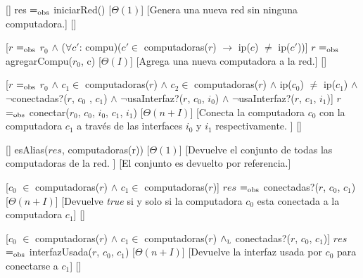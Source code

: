 \begin{Interfaz}
  


  

  [] %
  {res $=_{\mathrm{obs}}$ iniciarRed()} %
  [$\Theta(1)$] %
  [Genera una nueva red sin ninguna computadora.] %
  [] %
  
  [$r$ $=_{\mathrm{obs}}$ $r_{0}$ $\land$ ($\forall c'$: compu)($c' \in$ computadoras($r$) $\rightarrow$ ip($c$) $\neq$ ip($c'$))] %
  {$r$ $=_{\mathrm{obs}}$ agregarCompu($r_{0}$, c)} %
  [$\Theta(I)$] %
  [Agrega una nueva computadora a la red.] %
  [] %

  [$r$ $=_{\mathrm{obs}}$ $r_{0}$ $\land$ $c_{1} \in$ computadoras($r$) $\land$ $c_{2} \in$ computadoras($r$) $\land$ ip($c_{0} $) $\neq$ ip($c_{1}$) $\land$ $\lnot$conectadas?($r$, $c_{0}$ , $c_{1} $) $\land$ $\lnot$usaInterfaz?($r$, $c_{0}$, $i_{0}$) $\land$ $\lnot$usaInterfaz?($r$, $c_{1}$, $i_{1}$)] %
  {$r$ $=_{\mathrm{obs}}$ conectar($r_{0}$, $c_{0}$, $i_{0}$, $c_{1}$, $i_{1}$)} %
  [$\Theta(n+I)$] %
  [Conecta la computadora $c_{0}$ con la computadora $c_{1}$ a trav\'es de las interfaces $i_{0}$ y $i_{1}$ respectivamente. ] %
  [] %
  
  [] %
  {esAlias($res$, computadoras(r))} %
  [$\Theta(1)$] %
  [Devuelve el conjunto de todas las computadoras de la red. ] %
  [El conjunto es devuelto por referencia.] %
  
  [$c_{0}$ $\in$ computadoras($r$) $\land$ $c_{1} \in $ computadoras($r$)] %
  {$res$ $=_{\mathrm{obs}}$ conectadas?($r$, $c_{0}$, $c_{1}$)} %
  [$\Theta(n+I)$] %
  [Devuelve \emph{true} si y solo si la computadora $c_{0}$ esta conectada a la computadora $c_{1}$] %
  [] %
  
  [$c_{0}$ $\in$ computadoras($r$) $\land$ $c_{1} \in $ computadoras($r$) $\land_{\mathrm{\scriptscriptstyle{L}}}$ conectadas?($r$, $c_{0}$, $c_{1}$)] %
  {$res$ $=_{\mathrm{obs}}$ interfazUsada($r$, $c_{0}$, $c_{1}$)} %
  [$\Theta(n+I)$] %
  [Devuelve la interfaz usada por $c_{0}$ para conectarse a $c_{1}$] %
  [] %
  

\end{Interfaz}

